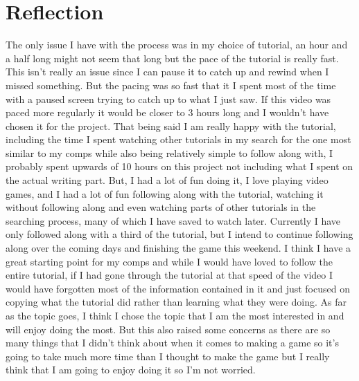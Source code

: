 \documentclass[10pt, twocolumn]{article}
\begin{document}
 \section{Reflection}
The only issue I have with the process was in my choice of tutorial, an hour and a half long might not seem that long but the pace of the tutorial is really fast. This isn't really an issue since I can pause it to catch up and rewind when I missed something. But the pacing was so fast that it I spent most of the time with a paused screen trying to catch up to what I just saw. If this video was paced more regularly it would be closer to 3 hours long and I wouldn't have chosen it for the project. That being said I am really happy with the tutorial, including the time I spent watching other tutorials in my search for the one most similar to my comps while also being relatively simple to follow along with, I probably spent upwards of 10 hours on this project not including what I spent on the actual writing part. But, I had a lot of fun doing it, I love playing video games, and I had a lot of fun following along with the tutorial, watching it without following along and even watching parts of other tutorials in the searching process, many of which I have saved to watch later. Currently I have only followed along with a third of the tutorial, but I intend to continue following along over the coming days and finishing the game this weekend. I think I have a great starting point for my comps and while I would have loved to follow the entire tutorial, if I had gone through the tutorial at that speed of the video I would have forgotten most of the information contained in it and just focused on copying what the tutorial did rather than learning what they were doing. As far as the topic goes, I think I chose the topic that I am the most interested in and will enjoy doing the most. But this also raised some concerns as there are so many things that I didn't think about when it comes to making a game so it's going to take much more time than I thought to make the game but I really think that I am going to enjoy doing it so I'm not worried.
\end{document}
